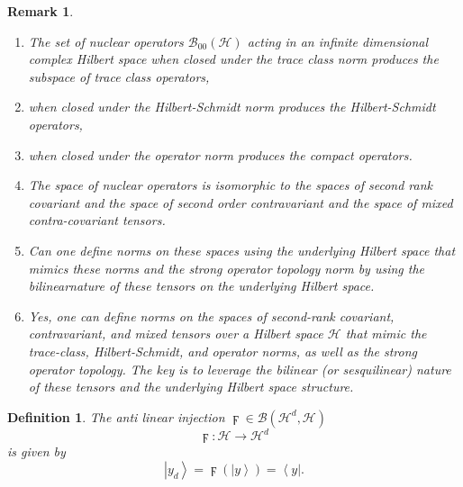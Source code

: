 \documentclass[aps,preprint]{revtex4}
\newtheorem{definition}[theorem]{Definition}
\newtheorem{remark}[theorem]{Remark}
\begin{document}
\begin{remark}
\begin{enumerate}
\item The set of nuclear operators $\mathcal{B}_{00}\left( \mathcal{H}%
\right) $ acting in an infinite dimensional complex Hilbert space when
closed under the trace class norm produces the subspace of trace class
operators,

\item when closed under the Hilbert-Schmidt norm produces the
Hilbert-Schmidt operators,

\item when closed under the operator norm produces the compact operators.

\item The space of nuclear operators is isomorphic to the spaces of second
rank covariant and the space of second order contravariant and the space of
mixed contra-covariant tensors.

\item Can one define norms on these spaces using the underlying Hilbert
space that mimics these norms and the strong operator topology norm by using
the bilinearnature of these tensors on the underlying Hilbert space.

\item Yes, one can define norms on the spaces of second-rank covariant,
contravariant, and mixed tensors over a Hilbert space $\mathcal{H}$ that
mimic the trace-class, Hilbert-Schmidt, and operator norms, as well as the
strong operator topology. The key is to leverage the bilinear (or
sesquilinear) nature of these tensors and the underlying Hilbert space
structure.
\end{enumerate}
\end{remark}

\begin{definition}
The anti linear injection $\digamma \in \mathcal{B}\left( \mathcal{H}^{d},%
\mathcal{H}\right) $%
\begin{equation}
\digamma :\mathcal{H}\rightarrow \mathcal{H}^{d}
\end{equation}%
is given by 
\begin{equation}
\left\vert y_{d}\right\rangle =\digamma \left( \left\vert y\right\rangle
\right) =\left\langle y\right\vert .
\end{equation}
\end{definition}
\end{document}
